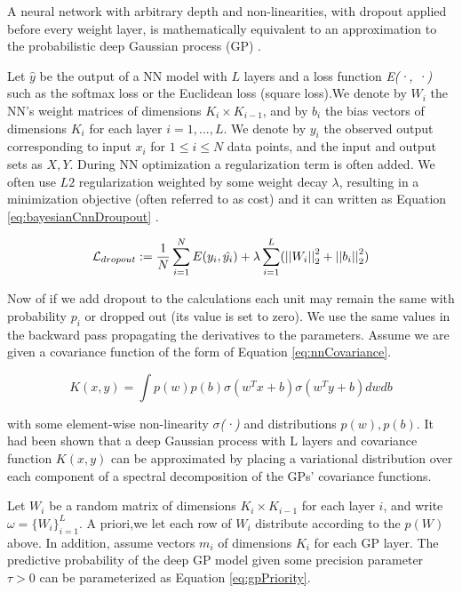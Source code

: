 \documentclass[preprint,12pt]{elsarticle}
\begin{document}
A neural network with arbitrary depth and non-linearities, with dropout applied before every weight layer, is mathematically equivalent to an approximation to the probabilistic deep Gaussian process (GP) \cite{Gal2016}.

Let $\hat{y}$ be the output of a NN model with $L$ layers and a loss function {\it E(·, ·)} such as the softmax loss or the Euclidean loss (square loss).We denote by $W_i$ the NN’s weight matrices of dimensions $K_i \times K_{i-1}$, and by $b_i$ the bias vectors of dimensions $K_i$ for each layer $i = 1, ..., L$. We denote by $y_i$ the observed output corresponding to input $x_i$ for $1 \leq i \leq N$ data points, and the input and output sets as $X, Y$. During NN optimization a regularization term is often added. We often use $L2$ regularization weighted by some weight decay $\lambda$, resulting in a minimization objective (often referred to as cost) and it can written as Equation  \eqref{eq:bayesianCnnDroupout} \cite{Gal2016}.

\begin{equation}
\mathcal{L}_{dropout} := 
    {1 \over N} \sum_{i=1}^{N} E(y_i , \hat{y_i}) + \\
    \lambda \sum_{i=1}^{L} ( \left|\left| W_i \right|\right|_2^2 + \left|\left| b_i \right|\right|_2^2 )
\label{eq:bayesianCnnDroupout} 
\end{equation}

Now of if we add dropout to the calculations each unit may remain the same with probability $p_i$ or dropped out (its value is set to zero). We use the same values in the backward pass propagating the derivatives to the parameters. Assume we are given a covariance function of the form of Equation \eqref{eq:nnCovariance}.

\begin{equation}
K(x, y) = \int p(w)p(b) \sigma (w^T x + b) \sigma (w^T y + b) dw db
\label{eq:nnCovariance}
\end{equation}

with some element-wise non-linearity {\it $\sigma$(·)} and distributions $p(w), p(b)$. It had been shown that a deep Gaussian process with L layers and covariance function $K(x,y)$ can be approximated by placing a variational distribution over each component of a spectral decomposition of the GPs’ covariance functions.

Let $W_i$ be a random matrix of dimensions $K_i \times K_{i-1}$ for each layer $i$, and write
$\omega = \{ W_i \}^L_{i=1}$. A priori,we let each row of $W_i$ distribute according to the $p(W)$ above. In addition, assume vectors $m_i$ of dimensions $K_i$ for each GP layer. The predictive probability of the deep GP model given some precision parameter $\tau > 0$ can be parameterized as Equation \eqref{eq:gpPriority}.
\end{document}
